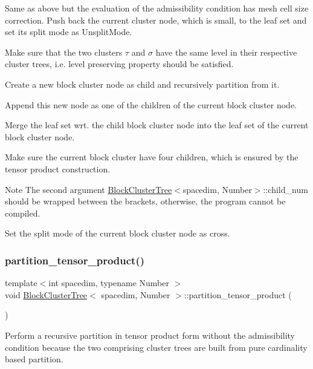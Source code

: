 Same as above but the evaluation of the admissibility condition has mesh cell size correction. Push back the current cluster node, which is small, to the leaf set and set its split mode as {\ttfamily Unsplit\+Mode}.

Make sure that the two clusters $\tau$ and $\sigma$ have the same level in their respective cluster trees, i.\+e. level preserving property should be satisfied.

Create a new block cluster node as child and recursively partition from it.

Append this new node as one of the children of the current block cluster node.

Merge the leaf set wrt. the child block cluster node into the leaf set of the current block cluster node.

Make sure the current block cluster have four children, which is ensured by the tensor product construction.


\begin{DoxyDescription}
\item[Note ]The second argument {\ttfamily \hyperlink{classBlockClusterTree}{Block\+Cluster\+Tree}$<$spacedim}, Number$>$\+::child\+\_\+num should be wrapped between the brackets, otherwise, the program cannot be compiled. 
\end{DoxyDescription}

Set the split mode of the current block cluster node as cross.\mbox{\label{classBlockClusterTree_ab10f54639969bc4aacd6aa27cf315610}} 
\subsubsection{\texorpdfstring{partition\+\_\+tensor\+\_\+product()}{partition\_tensor\_product()}}
{\footnotesize\ttfamily template$<$int spacedim, typename Number $>$ \\
void \hyperlink{classBlockClusterTree}{Block\+Cluster\+Tree}$<$ spacedim, Number $>$\+::partition\+\_\+tensor\+\_\+product (\begin{DoxyParamCaption}{ }\end{DoxyParamCaption})}

Perform a recursive partition in tensor product form without the admissibility condition because the two comprising cluster trees are built from pure cardinality based partition. 

